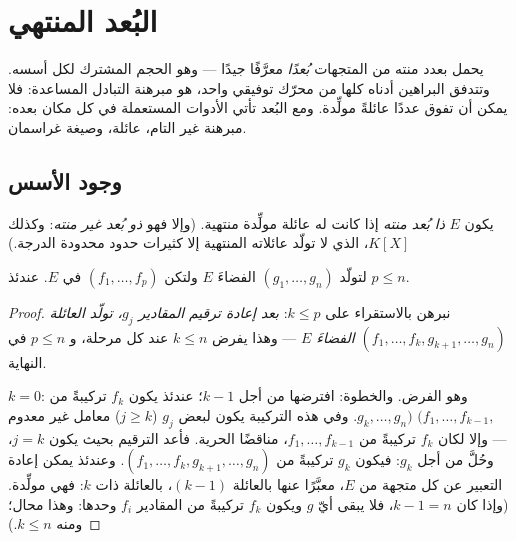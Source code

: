 \chapter{البُعد المنتهي}\label{ch:b1:findim}

يحمل  بعدد منته من المتجهات \emph{بُعدًا} معرَّفًا
جيدًا --- وهو الحجم المشترك لكل أسسه. وتتدفق البراهين
أدناه كلها من محرّك توفيقي واحد، هو مبرهنة التبادل المساعدة:
فلا يمكن  أن تفوق عددًا عائلةً مولِّدة. ومع البُعد
تأتي الأدوات المستعملة في كل مكان بعده: مبرهنة 
غير التام،  عائلة، وصيغة غراسمان.

\section{وجود الأسس}

\begin{definition}\label{def:b1:findim:def}
يكون $E$ \emph{ذا بُعد منته} إذا كانت له
عائلة مولِّدة منتهية. (وإلا فهو \emph{ذو بُعد غير منته}:
وكذلك $K[X]$، الذي لا تولّد عائلاته المنتهية إلا كثيرات حدود محدودة
الدرجة.)
\end{definition}

\begin{theorem}\label{thm:b1:findim:exchange}
لتولّد $(g_1, \dots, g_n)$ الفضاءَ $E$ ولتكن $(f_1, \dots, f_p)$ 
في $E$. عندئذ $p \leq n$.
\end{theorem}

\begin{proof}
نبرهن بالاستقراء على $k \leq p$: \emph{بعد إعادة ترقيم
المقادير $g_j$، تولّد العائلة $(f_1, \dots, f_k, g_{k+1}, \dots, g_n)$ الفضاءَ
$E$} --- وهذا يفرض $k \leq n$ عند كل مرحلة، و $p \leq n$ في
النهاية.

$k = 0$: وهو الفرض. والخطوة: افترضها من أجل $k - 1$؛ عندئذ يكون $f_k$
تركيبةً من $(f_1, \dots, f_{k-1},$ $g_k, \dots, g_n)$. وفي
هذه التركيبة يكون لبعض $g_j$ ($j \geq k$) معامل غير معدوم
---
وإلا لكان $f_k$ تركيبةً من $f_1, \dots, f_{k-1}$،
مناقضًا الحرية. فأعد الترقيم بحيث يكون $j = k$، وحُلَّ من أجل
$g_k$: فيكون $g_k$ تركيبةً من $(f_1, \dots, f_k, g_{k+1}, \dots,
g_n)$. وعندئذ يمكن إعادة التعبير عن كل متجهة من $E$، معبَّرًا عنها بالعائلة $(k-1)$،
بالعائلة ذات $k$: فهي مولِّدة.
(وإذا كان $k - 1 = n$، فلا يبقى أيّ $g$ ويكون $f_k$ تركيبةً من
المقادير $f_i$ وحدها: وهذا محال؛ ومنه $k \leq n$.)
\end{proof}

